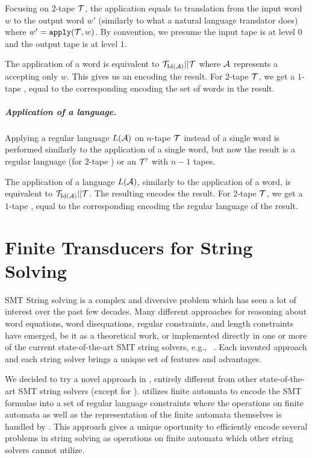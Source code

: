 Focusing on $2$-tape \nfts $\mathcal{T}$, the application equals to translation from the input word $w$ to the output word $w'$ (similarly to what a natural language translator does) where $w' = \texttt{apply}(\mathcal{T}, w)$.
By convention, we presume the input tape is at level $0$ and the output tape is at level $1$.

The application of a word is equivalent to $\mathcal{T}_{\text{Id}(\mathcal{A})} || \mathcal{T}$ where $\mathcal{A}$ represents a \dfa accepting only $w$.
This gives us an \nft encoding the result.
For $2$-tape $\mathcal{T}$, we get a $1$-tape \nft, equal to the corresponding \nfa encoding the set of words in the result.

\paragraph{Application of a language.}
Applying a regular language $L(\mathcal{A})$ on $n$-tape \nft $\mathcal{T}$ instead of a single word is performed similarly to the application of a single word, but now the result is a regular language (for $2$-tape \nfts) or an \nft $\mathcal{T}'$ with $n-1$ tapes.

The application of a language $L(\mathcal{A})$, similarly to the application of a word, is equivalent to $\mathcal{T}_{\text{Id}(\mathcal{A})} || \mathcal{T}$.
The resulting \nft encodes the result.
For $2$-tape $\mathcal{T}$, we get a $1$-tape \nft, equal to the corresponding \nfa encoding the regular language of the result.



\chapter{Finite Transducers for String Solving}

SMT String solving is a complex and diversive problem which has seen a lot of interest over the past few decades.
Many different approaches for reasoning about word equations, word disequations, regular constraints, and length constraints have emerged, be it as a theoretical work, or implemented directly in one or more of the current state-of-the-art SMT string solvers, e.g., ~\cite{cvc4,cvc5,z3,Z3-str,Z3Str3,Z3str4,Trau,fm23_equations_synergy_regular_constraints_DBLP:conf/fm/BlahoudekCCHHLS23, tacas24_noodler_10.1007/978-3-031-57246-3_2, oopsla23_stabilization_DBLP:journals/pacmpl/ChenCHHLS23}.
Each invented approach and each string solver brings a unique set of features and advantages.

We decided to try a novel approach in \noodler, entirely different from other state-of-the-art SMT string solvers (except for \ostrich).
\noodler utilizes finite automata to encode the SMT formulae into a set of regular language constraints where the operations on finite automata as well as the representation of the finite automata themselves is handled by \mata.
This approach gives \noodler a unique oportunity to efficiently encode several problems in string solving as operations on finite automata which other string solvers cannot utilize.

